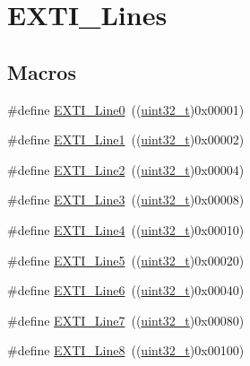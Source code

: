 \hypertarget{group___e_x_t_i___lines}{}\section{E\+X\+T\+I\+\_\+\+Lines}
\label{group___e_x_t_i___lines}
\subsection*{Macros}
\begin{DoxyCompactItemize}
\item 
\#define \hyperlink{group___e_x_t_i___lines_gac2a65680200dd5f4f7eab29cd4091a75}{E\+X\+T\+I\+\_\+\+Line0}~((\hyperlink{_p_e___types_8h_a33594304e786b158f3fb30289278f5af}{uint32\+\_\+t})0x00001)
\item 
\#define \hyperlink{group___e_x_t_i___lines_gae7c6ab2a0880ce3810641ee0585104cd}{E\+X\+T\+I\+\_\+\+Line1}~((\hyperlink{_p_e___types_8h_a33594304e786b158f3fb30289278f5af}{uint32\+\_\+t})0x00002)
\item 
\#define \hyperlink{group___e_x_t_i___lines_gaec4189bb2709c8c15a0339d1b0b9865a}{E\+X\+T\+I\+\_\+\+Line2}~((\hyperlink{_p_e___types_8h_a33594304e786b158f3fb30289278f5af}{uint32\+\_\+t})0x00004)
\item 
\#define \hyperlink{group___e_x_t_i___lines_gadea3ef6ab7e8bacc686689de8711b98c}{E\+X\+T\+I\+\_\+\+Line3}~((\hyperlink{_p_e___types_8h_a33594304e786b158f3fb30289278f5af}{uint32\+\_\+t})0x00008)
\item 
\#define \hyperlink{group___e_x_t_i___lines_gab33b1fe19306e9e60f8f8d0928b800be}{E\+X\+T\+I\+\_\+\+Line4}~((\hyperlink{_p_e___types_8h_a33594304e786b158f3fb30289278f5af}{uint32\+\_\+t})0x00010)
\item 
\#define \hyperlink{group___e_x_t_i___lines_ga6b4c6292e3abd521cab2bf99d37a15c6}{E\+X\+T\+I\+\_\+\+Line5}~((\hyperlink{_p_e___types_8h_a33594304e786b158f3fb30289278f5af}{uint32\+\_\+t})0x00020)
\item 
\#define \hyperlink{group___e_x_t_i___lines_ga97a5145d1d2612dd53bdd9db3d366873}{E\+X\+T\+I\+\_\+\+Line6}~((\hyperlink{_p_e___types_8h_a33594304e786b158f3fb30289278f5af}{uint32\+\_\+t})0x00040)
\item 
\#define \hyperlink{group___e_x_t_i___lines_ga3b7155d54a4a98394b599718901ccbe5}{E\+X\+T\+I\+\_\+\+Line7}~((\hyperlink{_p_e___types_8h_a33594304e786b158f3fb30289278f5af}{uint32\+\_\+t})0x00080)
\item 
\#define \hyperlink{group___e_x_t_i___lines_gacd51e087a088c3315049394cddf79e88}{E\+X\+T\+I\+\_\+\+Line8}~((\hyperlink{_p_e___types_8h_a33594304e786b158f3fb30289278f5af}{uint32\+\_\+t})0x00100)

\end{DoxyCompactItemize}
